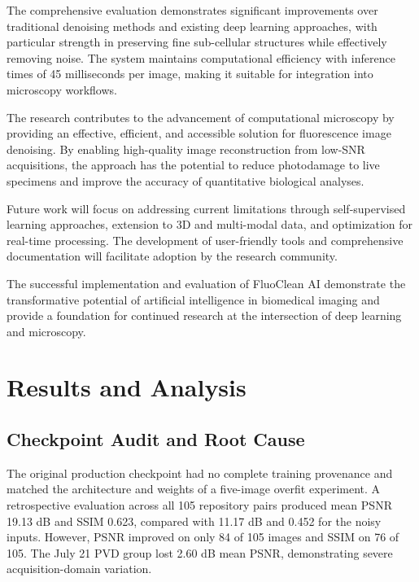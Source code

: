 \documentclass[12pt,a4paper]{report}
\begin{document}
\vspace{0.5cm}

The comprehensive evaluation demonstrates significant improvements over traditional denoising methods and existing deep learning approaches, with particular strength in preserving fine sub-cellular structures while effectively removing noise. The system maintains computational efficiency with inference times of 45 milliseconds per image, making it suitable for integration into microscopy workflows.

\vspace{0.5cm}

The research contributes to the advancement of computational microscopy by providing an effective, efficient, and accessible solution for fluorescence image denoising. By enabling high-quality image reconstruction from low-SNR acquisitions, the approach has the potential to reduce photodamage to live specimens and improve the accuracy of quantitative biological analyses.

\vspace{0.5cm}

Future work will focus on addressing current limitations through self-supervised learning approaches, extension to 3D and multi-modal data, and optimization for real-time processing. The development of user-friendly tools and comprehensive documentation will facilitate adoption by the research community.

\vspace{0.5cm}

The successful implementation and evaluation of FluoClean AI demonstrate the transformative potential of artificial intelligence in biomedical imaging and provide a foundation for continued research at the intersection of deep learning and microscopy.

\fi

\chapter{Results and Analysis}
\label{chap:validated_results}

\section{Checkpoint Audit and Root Cause}

The original production checkpoint had no complete training provenance and matched the architecture and weights of a five-image overfit experiment. A retrospective evaluation across all 105 repository pairs produced mean PSNR 19.13 dB and SSIM 0.623, compared with 11.17 dB and 0.452 for the noisy inputs. However, PSNR improved on only 84 of 105 images and SSIM on 76 of 105. The July 21 PVD group lost 2.60 dB mean PSNR, demonstrating severe acquisition-domain variation.
\end{document}
